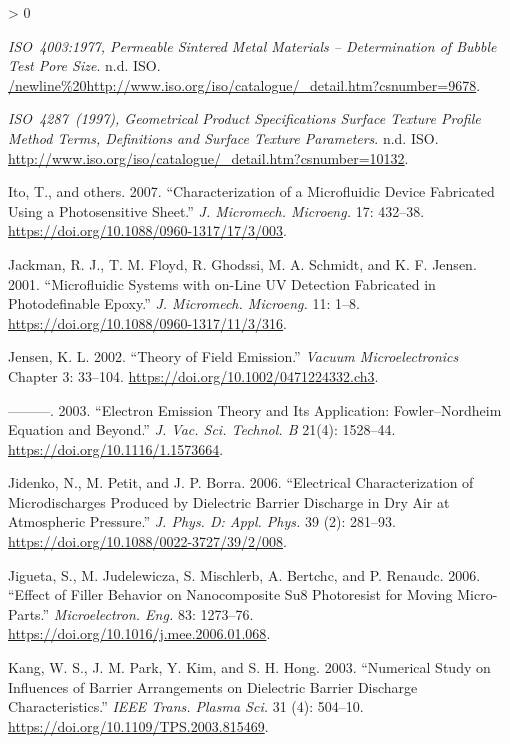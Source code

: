 \documentclass[
  10pt,
  twoside]{article}
\newlength{\cslhangindent}
\newenvironment{CSLReferences}[2] %
 {%
  \setlength{\parindent}{0pt}
  \ifodd #1 \everypar{\setlength{\hangindent}{\cslhangindent}}\ignorespaces\fi
  \ifnum #2 > 0
  \setlength{\parskip}{#2\baselineskip}
  \fi
 }%
 {}
\begin{document}
\begin{CSLReferences}{1}{0}
\leavevmode\hypertarget{ref-ISO4003}{}%
\emph{{ISO}~4003:1977, Permeable Sintered Metal Materials -- Determination of Bubble Test Pore Size}. n.d. ISO. \url{/newline\%20http://www.iso.org/iso/catalogue/_detail.htm?csnumber=9678}.

\leavevmode\hypertarget{ref-ISO4287}{}%
\emph{{ISO}~4287~(1997), Geometrical Product Specifications Surface Texture Profile Method Terms, Definitions and Surface Texture Parameters}. n.d. ISO. \url{http://www.iso.org/iso/catalogue/_detail.htm?csnumber=10132}.

\leavevmode\hypertarget{ref-Ito07}{}%
Ito, T., and others. 2007. {``Characterization of a Microfluidic Device Fabricated Using a Photosensitive Sheet.''} \emph{J. Micromech. Microeng.} 17: 432--38. \url{https://doi.org/10.1088/0960-1317/17/3/003}.

\leavevmode\hypertarget{ref-Jack01}{}%
Jackman, R. J., T. M. Floyd, R. Ghodssi, M. A. Schmidt, and K. F. Jensen. 2001. {``Microfluidic Systems with on-Line UV Detection Fabricated in Photodefinable Epoxy.''} \emph{J. Micromech. Microeng.} 11: 1--8. \url{https://doi.org/10.1088/0960-1317/11/3/316}.

\leavevmode\hypertarget{ref-Jens02}{}%
Jensen, K. L. 2002. {``Theory of Field Emission.''} \emph{Vacuum Microelectronics} Chapter 3: 33--104. \url{https://doi.org/10.1002/0471224332.ch3}.

\leavevmode\hypertarget{ref-Jens03}{}%
---------. 2003. {``Electron Emission Theory and Its Application: Fowler--Nordheim Equation and Beyond.''} \emph{J. Vac. Sci. Technol. B} 21(4): 1528--44. \url{https://doi.org/10.1116/1.1573664}.

\leavevmode\hypertarget{ref-Jide06}{}%
Jidenko, N., M. Petit, and J. P. Borra. 2006. {``Electrical Characterization of Microdischarges Produced by Dielectric Barrier Discharge in Dry Air at Atmospheric Pressure.''} \emph{J. Phys. D: Appl. Phys.} 39 (2): 281--93. \url{https://doi.org/10.1088/0022-3727/39/2/008}.

\leavevmode\hypertarget{ref-Jigu06}{}%
Jigueta, S., M. Judelewicza, S. Mischlerb, A. Bertchc, and P. Renaudc. 2006. {``Effect of Filler Behavior on Nanocomposite {Su8} Photoresist for Moving Micro-Parts.''} \emph{Microelectron. Eng.} 83: 1273--76. \url{https://doi.org/10.1016/j.mee.2006.01.068}.

\leavevmode\hypertarget{ref-Kang03}{}%
Kang, W. S., J. M. Park, Y. Kim, and S. H. Hong. 2003. {``Numerical Study on Influences of Barrier Arrangements on Dielectric Barrier Discharge Characteristics.''} \emph{IEEE Trans. Plasma Sci.} 31 (4): 504--10. \url{https://doi.org/10.1109/TPS.2003.815469}.


\end{CSLReferences}
\end{document}
